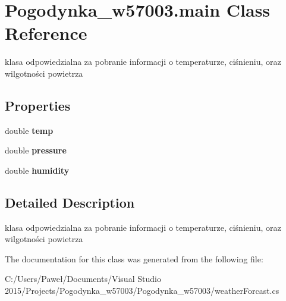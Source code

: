 \hypertarget{class_pogodynka__w57003_1_1main}{}\section{Pogodynka\+\_\+w57003.\+main Class Reference}
\label{class_pogodynka__w57003_1_1main}


klasa odpowiedzialna za pobranie informacji o temperaturze, ciśnieniu, oraz wilgotności powietrza  


\subsection*{Properties}
\begin{DoxyCompactItemize}
\item 
\mbox{\label{class_pogodynka__w57003_1_1main_a17f39b6d6da5d6d247bcd4d209b4f226}} 
double {\bfseries temp}
\item 
\mbox{\label{class_pogodynka__w57003_1_1main_a252f264966164ce699bf14ef40309ba5}} 
double {\bfseries pressure}
\item 
\mbox{\label{class_pogodynka__w57003_1_1main_abc8be82c5bb42bc5442b75aeed0926bb}} 
double {\bfseries humidity}
\end{DoxyCompactItemize}


\subsection{Detailed Description}
klasa odpowiedzialna za pobranie informacji o temperaturze, ciśnieniu, oraz wilgotności powietrza 



The documentation for this class was generated from the following file\+:\begin{DoxyCompactItemize}
\item 
C\+:/\+Users/\+Paweł/\+Documents/\+Visual Studio 2015/\+Projects/\+Pogodynka\+\_\+w57003/\+Pogodynka\+\_\+w57003/weather\+Forcast.\+cs\end{DoxyCompactItemize}
